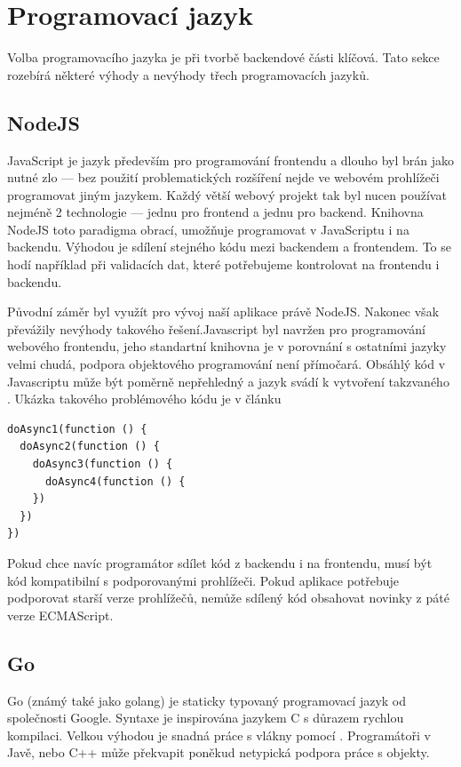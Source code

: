\section{Programovací jazyk}

Volba programovacího jazyka je při tvorbě backendové části klíčová. Tato sekce rozebírá některé výhody a nevýhody třech programovacích jazyků.

\subsection{NodeJS}

JavaScript je jazyk především pro programování frontendu a dlouho byl brán jako nutné zlo --- bez použití problematických rozšíření nejde ve webovém prohlížeči programovat jiným jazykem. Každý větší webový projekt tak byl nucen používat nejméně 2 technologie --- jednu pro frontend a jednu pro backend. Knihovna NodeJS toto paradigma obrací, umožňuje programovat v JavaScriptu i na backendu. Výhodou je sdílení stejného kódu mezi backendem a frontendem. To se hodí například při validacích dat, které potřebujeme kontrolovat na frontendu i backendu.

Původní záměr byl využít pro vývoj naší aplikace právě NodeJS. Nakonec však převážily nevýhody takového řešení.Javascript byl navržen pro programování webového frontendu, jeho standartní knihovna je v porovnání s ostatními jazyky velmi chudá, podpora objektového programování není přímočará. Obsáhlý kód v Javascriptu může být poměrně nepřehledný a jazyk svádí k vytvoření takzvaného . Ukázka takového problémového kódu je v článku \cite{callback}

\begin{lstlisting}
doAsync1(function () {
  doAsync2(function () {
    doAsync3(function () {
      doAsync4(function () {
    })
  })
})
\end{lstlisting}


 Pokud chce navíc programátor sdílet kód z backendu i na frontendu, musí být kód kompatibilní s podporovanými prohlížeči. Pokud aplikace potřebuje podporovat starší verze prohlížečů, nemůže sdílený kód obsahovat novinky z páté verze ECMAScript\cite{ecma}.

\subsection{Go}

Go (známý také jako golang)\cite{golang} je staticky typovaný programovací jazyk od společnosti Google. Syntaxe je inspirována jazykem C s důrazem rychlou kompilaci. Velkou výhodou je snadná práce s vlákny pomocí . Programátoři v Javě, nebo C++ může překvapit poněkud netypická podpora práce s objekty.

